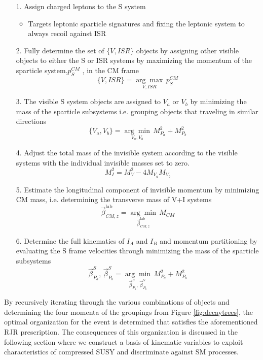 \begin{itemize}
\item[1.] Assign charged leptons to the S system
\begin{itemize}
	\item Targets leptonic sparticle signatures and fixing the leptonic system to always recoil against ISR
\end{itemize}
\item[2.] Fully determine the set of $\{V,ISR\}$ objects by assigning other visible objects to either the S or ISR systems by maximizing the momentum of the sparticle system,$p_S^{CM}$ , in the CM frame
\begin{equation}
\{V,ISR\} =  \underset{V,ISR}{\arg\max} \, p_S^{CM}
\end{equation}
\item[3.] The visible S system objects are assigned to $V_a$ or $V_b$ by minimizing the mass of the sparticle subsystems i.e. grouping objects that traveling in similar directions
\begin{equation}
\{V_a,V_b\} = \underset{V_a,V_b}{\arg\min} \, M_{P_a}^2 + M_{P_b}^2
\end{equation}
\item[4.] Adjust the total mass of the invisible system according to the visible systems with the individual invisible masses set to zero.
\begin{equation}
M_I^2 = M_V^2 - 4M_{V_a}M_{V_b}
\end{equation}
\item[5.] Estimate the longitudinal component of invisible momentum by minimizing CM mass, i.e. determining the transverse mass of V+I systems
\begin{equation}
 \vec{\beta}_{CM,z}^{\text{lab}} = \underset{\vec{\beta}_{CM,z}^{\text{lab}} } {\arg\min} \, M_{CM}
\end{equation}
\item[6.] Determine the full kinematics of $I_A$ and $I_B$ and momentum partitioning  by evaluating the S frame velocities through minimizing the mass of the sparticle subsystems
\begin{equation}
\vec{\beta}_{P_a}^S, \, \vec{\beta}_{P_b}^S = \underset{\vec{\beta}_{P_a}^S, \, \vec{\beta}_{P_b}^S}{\arg\min} \, M_{P_a}^2 + M_{P_b}^2
\end{equation}
\end{itemize}

By recursively iterating through the various combinations of objects and determining  the four momenta of the groupings from Figure \ref{fig:decaytrees}, the optimal organization for the event is determined that satisfies the aforementioned RJR prescription. The consequences of this organization is discussed in the following section where we construct a basis of kinematic variables to exploit characteristics of compressed SUSY and discriminate against SM processes.



